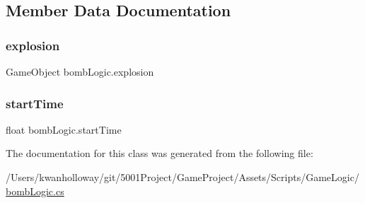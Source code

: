 \subsection{Member Data Documentation}
\mbox{\label{classbomb_logic_ac6665f96ce4dd6eb83e5f3e7aff71f40}} 
\subsubsection{\texorpdfstring{explosion}{explosion}}
{\footnotesize\ttfamily Game\+Object bomb\+Logic.\+explosion}

\mbox{\label{classbomb_logic_a228ae603f0d01e43eb67c2c5dea04a96}} 
\subsubsection{\texorpdfstring{start\+Time}{startTime}}
{\footnotesize\ttfamily float bomb\+Logic.\+start\+Time}



The documentation for this class was generated from the following file\+:\begin{DoxyCompactItemize}
\item 
/\+Users/kwanholloway/git/5001\+Project/\+Game\+Project/\+Assets/\+Scripts/\+Game\+Logic/\hyperlink{bomb_logic_8cs}{bomb\+Logic.\+cs}\end{DoxyCompactItemize}
